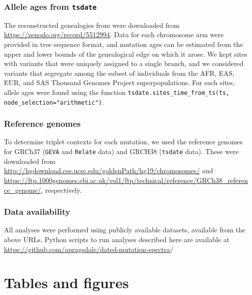 \documentclass[]{article}
\newcommand{\GEVA}{\texttt{GEVA}\xspace}
\newcommand{\tsdate}{\texttt{tsdate}\xspace}
\newcommand{\relate}{\texttt{Relate}\xspace}
\begin{document}
\subsubsection*{Allele ages from \tsdate}

The reconstructed genealogies from \citet{wohns2022unified} were downloaded
from \url{https://zenodo.org/record/5512994}. Data for each chromosome arm were
provided in tree sequence format, and mutation ages can be estimated from the
upper and lower bounds of the genealogical edge on which it arose. We kept
sites with variants that were uniquely assigned to a single branch, and we
considered variants that segregate among the subset of individuals from the
AFR, EAS, EUR, and SAS Thousand Genomes Project superpopulations. For such
sites, allele ages were found using the function
\texttt{tsdate.sites\_time\_from\_ts(ts, node\_selection="arithmetic")}.

\subsubsection*{Reference genomes} To determine triplet contexts for each
mutation, we used the reference genomes for GRCh37 (\GEVA and \relate data) and
GRCH38 (\tsdate data). These were downloaded from
\url{http://hgdownload.cse.ucsc.edu/goldenPath/hg19/chromosomes/} and
\url{https://ftp.1000genomes.ebi.ac.uk/vol1/ftp/technical/reference/GRCh38_reference_genome/},
respectively.

\subsubsection*{Data availability}

All analyses were performed using publicly available datasets, available from
the above URLs. Python scripts to run analyses described here are available at
\url{https://github.com/apragsdale/dated-mutation-spectra}/




\section*{Tables and figures}
\end{document}
